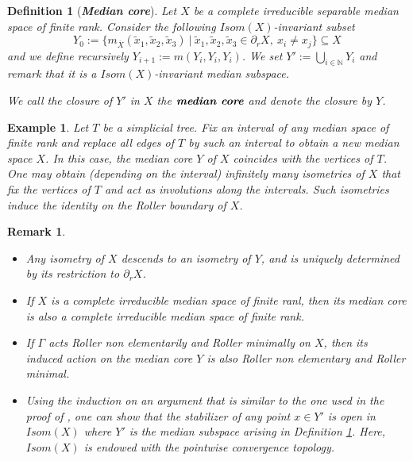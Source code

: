 \documentclass{amsart}
\numberwithin{equation}{section}
\newtheorem{defi}[thm]{Definition}
\newtheorem{rmk}[thm]{Remark}
\newtheorem{exm}[thm]{Example}
\newcommand{\NN}{\mathbb{N}}      %
\theoremstyle{definition}
\def\bar{\overline}
\begin{document}
\begin{defi}[\textbf{\textit{Median core}}]\label{def_median_core}
    Let $X$ be a complete irreducible separable median space of finite rank. 
    Consider the following $Isom(X)$-invariant subset
  \[
    Y_0:=\{m_{\bar X}(\tilde{x}_1,\tilde{x}_2,\tilde{x}_3) \ |\ \tilde{x}_1,\tilde{x}_2,\tilde{x}_3\in  \partial_r X, \ x_i\neq x_j\}\subseteq X 
  \]
    and we define recursively $Y_{i+1}:= m(Y_i,Y_i,Y_i)$. We set $Y':=\displaystyle{\bigcup_{i\in\NN}Y_i}$ and remark that it is a $Isom(X)$-invariant median subspace.\par
   We call the closure of $Y'$ in $X$ the $\textbf{\textit{median core}}$ and denote the closure by $Y$.%
\end{defi}

\begin{exm}
    Let $T$ be a simplicial tree. Fix an interval of any median space of finite rank and replace all edges of $T$ by such an interval to obtain a new median space $X$. In this case, the median core $Y$ of $X$ coincides with the vertices of $T$. One may obtain (depending on the interval) infinitely many isometries of $X$ that fix the vertices of $T$ and act as involutions along the intervals. Such isometries induce the identity on the Roller boundary of $X$. 
 \end{exm}
 
\begin{rmk}\label{remark_median_core}
  \begin{itemize}
      \item Any isometry of $X$ descends to an isometry of $Y$, and is uniquely determined by its restriction to $\partial_r X$.
      \item If $X$ is a complete irreducible median space of finite ranl, then its median core is also a complete irreducible median space of finite rank.
      \item  If $\Gamma$ acts Roller non elementarily and Roller minimally on $X$, then its induced action on the median core $Y$ is also Roller non elementary and Roller minimal. 
      \item Using the induction on an argument that is similar to the one used in the proof of \cite[Theorem B]{Messaci}, one can show that the stabilizer of any point $x\in Y'$ is open in $Isom(X)$ where $Y'$ is the median subspace arising in Definition \ref{def_median_core}. Here, $Isom(X)$ is endowed with the pointwise convergence topology.
  \end{itemize}
\end{rmk}
\end{document}
